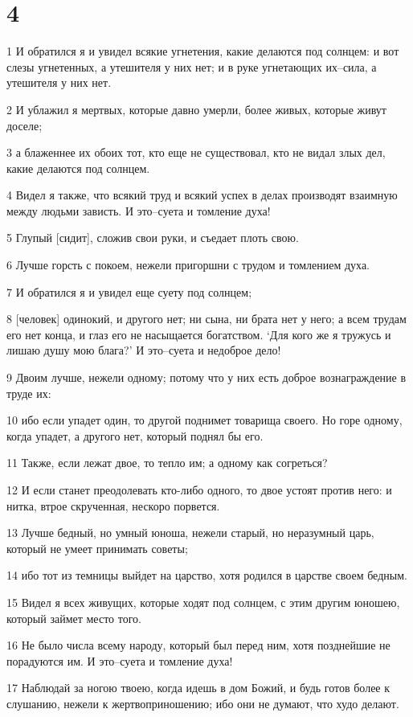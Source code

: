 \chapter{4}

\par 1 И обратился я и увидел всякие угнетения, какие делаются под солнцем: и вот слезы угнетенных, а утешителя у них нет; и в руке угнетающих их--сила, а утешителя у них нет.
\par 2 И ублажил я мертвых, которые давно умерли, более живых, которые живут доселе;
\par 3 а блаженнее их обоих тот, кто еще не существовал, кто не видал злых дел, какие делаются под солнцем.
\par 4 Видел я также, что всякий труд и всякий успех в делах производят взаимную между людьми зависть. И это--суета и томление духа!
\par 5 Глупый [сидит], сложив свои руки, и съедает плоть свою.
\par 6 Лучше горсть с покоем, нежели пригоршни с трудом и томлением духа.
\par 7 И обратился я и увидел еще суету под солнцем;
\par 8 [человек] одинокий, и другого нет; ни сына, ни брата нет у него; а всем трудам его нет конца, и глаз его не насыщается богатством. `Для кого же я тружусь и лишаю душу мою блага?' И это--суета и недоброе дело!
\par 9 Двоим лучше, нежели одному; потому что у них есть доброе вознаграждение в труде их:
\par 10 ибо если упадет один, то другой поднимет товарища своего. Но горе одному, когда упадет, а другого нет, который поднял бы его.
\par 11 Также, если лежат двое, то тепло им; а одному как согреться?
\par 12 И если станет преодолевать кто-либо одного, то двое устоят против него: и нитка, втрое скрученная, нескоро порвется.
\par 13 Лучше бедный, но умный юноша, нежели старый, но неразумный царь, который не умеет принимать советы;
\par 14 ибо тот из темницы выйдет на царство, хотя родился в царстве своем бедным.
\par 15 Видел я всех живущих, которые ходят под солнцем, с этим другим юношею, который займет место того.
\par 16 Не было числа всему народу, который был перед ним, хотя позднейшие не порадуются им. И это--суета и томление духа!
\par 17 Наблюдай за ногою твоею, когда идешь в дом Божий, и будь готов более к слушанию, нежели к жертвоприношению; ибо они не думают, что худо делают.

